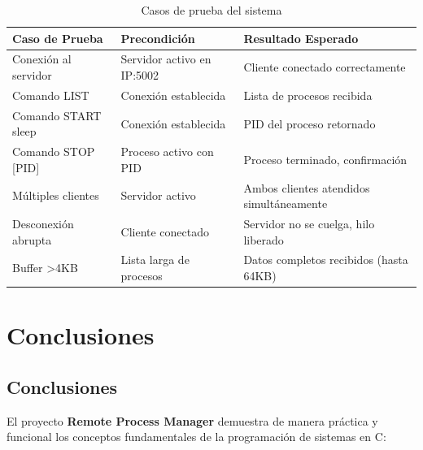\documentclass[12pt,a4paper]{report}
\begin{document}
\begin{table}[H]
  \centering
  \begin{tabular}{p{3.5cm} p{4cm} p{4.5cm}}
    \toprule
    \textbf{Caso de Prueba} & \textbf{Precondición} & \textbf{Resultado Esperado} \\
    \midrule
    Conexión al servidor & Servidor activo en IP:5002 & Cliente conectado correctamente \\
    Comando LIST & Conexión establecida & Lista de procesos recibida \\
    Comando START sleep & Conexión establecida & PID del proceso retornado \\
    Comando STOP [PID] & Proceso activo con PID & Proceso terminado, confirmación \\
    Múltiples clientes & Servidor activo & Ambos clientes atendidos simultáneamente \\
    Desconexión abrupta & Cliente conectado & Servidor no se cuelga, hilo liberado \\
    Buffer >4KB & Lista larga de procesos & Datos completos recibidos (hasta 64KB) \\
    \bottomrule
  \end{tabular}
  \caption{Casos de prueba del sistema}
\end{table}

\chapter{Conclusiones}

\section{Conclusiones}

El proyecto \textbf{Remote Process Manager} demuestra de manera práctica y funcional los conceptos fundamentales de la programación de sistemas en C:
\end{document}
